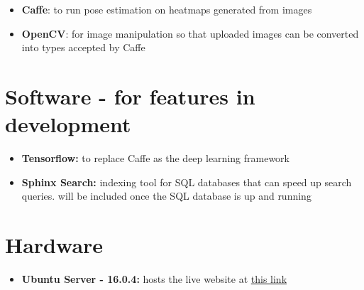 \documentclass{scrreprt}
\begin{document}
\begin{itemize}
    \item \textbf{Caffe}: to run pose estimation on heatmaps generated from images
    \item \textbf{OpenCV}: for image manipulation so that uploaded images can be converted into types accepted by Caffe
\end{itemize}

\section{Software - for features in development}

\begin{itemize}
    \item \textbf{Tensorflow:} to replace Caffe as the deep learning framework
    \item \textbf{Sphinx Search:} indexing tool for SQL databases that can speed up search queries. will be included once the SQL database is up and running
\end{itemize}

\section{Hardware}

\begin{itemize}
    \item \textbf{Ubuntu Server - 16.0.4:} hosts the live website at \href{159.203.10.112}{this link}
\end{itemize}
\end{document}
